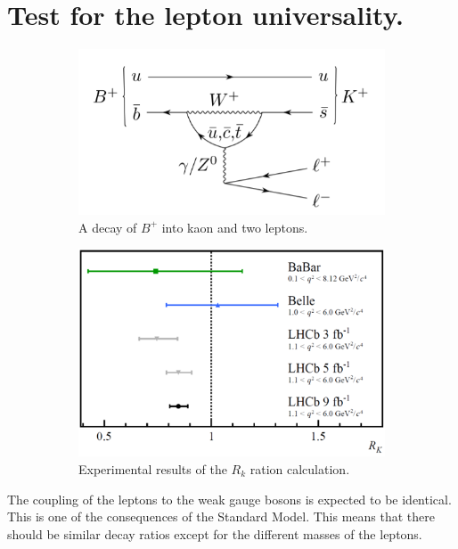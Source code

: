 \section{Test for the lepton universality.}
\label{sec:lepton-uni}

\begin{figure}
\begin{subfigure}[t]{0.5\textwidth}
  \centering
  \includegraphics[width=\linewidth]{figures/chapter1/BKLL.png}
  \caption{A decay of $B^{+}$ into kaon and two leptons.}
\end{subfigure}
\begin{subfigure}[t]{0.5\textwidth}
  \centering
  \includegraphics[width=\linewidth]{figures/chapter1/RK2021_s.png}
  \caption{Experimental results of the $R_{k}$ ration calculation.}
\end{subfigure}
 \caption[Experiments]{}
  \label{fig:bkll}
\end{figure}

The coupling of the leptons to the weak gauge bosons is expected to be identical. This is one of the consequences of the Standard Model.
This means that there should be similar decay ratios except for the different masses of the leptons.

